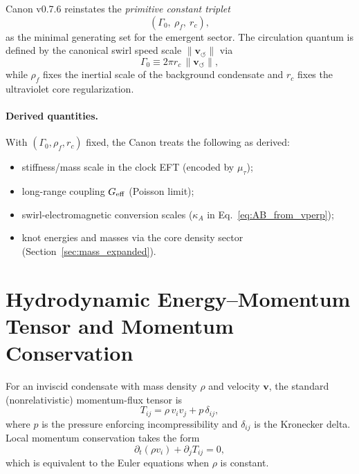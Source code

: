 \documentclass[10pt]{article}
\begin{document}
Canon v0.7.6 reinstates the \emph{primitive constant triplet}
\begin{equation}
    (\Gamma_0,\ \rho_{\!f},\ r_c),
\end{equation}
as the minimal generating set for the emergent sector.
The circulation quantum is defined by the canonical swirl speed scale
$\lVert \mathbf{v}_{\!\boldsymbol{\circlearrowleft}}\rVert$ via
\begin{equation}
    \Gamma_0 \equiv 2\pi r_c\,\lVert \mathbf{v}_{\!\boldsymbol{\circlearrowleft}}\rVert,
\end{equation}
while $\rho_{\!f}$ fixes the inertial scale of the background condensate and $r_c$
fixes the ultraviolet core regularization.

\paragraph{Derived quantities.}
With $(\Gamma_0,\rho_{\!f},r_c)$ fixed, the Canon treats the following as derived:
\begin{itemize}
    \item stiffness/mass scale in the clock EFT (encoded by $\mu_\tau$);
    \item long-range coupling $G_{\rm eff}$ (Poisson limit);
    \item swirl-electromagnetic conversion scales ($\kappa_A$ in
    Eq.~\eqref{eq:AB_from_vperp});
    \item knot energies and masses via the core density sector
    (Section~\ref{sec:mass_expanded}).
\end{itemize}

    \section{Hydrodynamic Energy--Momentum Tensor and Momentum Conservation}
    \label{app:stress_tensor}

For an inviscid condensate with mass density $\rho$ and velocity $\mathbf{v}$,
the standard (nonrelativistic) momentum-flux tensor is
\begin{equation}
    T_{ij} = \rho\,v_i v_j + p\,\delta_{ij},
    \label{eq:stress_tensor_basic}
\end{equation}
where $p$ is the pressure enforcing incompressibility and $\delta_{ij}$ is the
Kronecker delta. Local momentum conservation takes the form
\begin{equation}
    \partial_t(\rho v_i) + \partial_j T_{ij} = 0,
\end{equation}
which is equivalent to the Euler equations when $\rho$ is constant.
\end{document}
